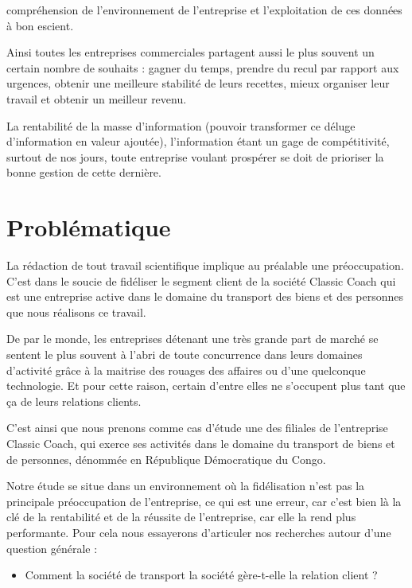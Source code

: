     compréhension de l’environnement de l’entreprise et l’exploitation de ces données à bon
    escient.
    \par
    Ainsi toutes les entreprises commerciales partagent aussi
    le plus souvent un certain nombre de souhaits : gagner
    du temps, prendre du recul par rapport aux urgences, obtenir une meilleure
    stabilité de leurs recettes, mieux organiser leur travail et obtenir un meilleur
    revenu. \cite*{Barouch2010}
    \par
    La rentabilité de la masse d’information (pouvoir transformer ce déluge
    d’information en valeur ajoutée), l’information étant un gage de compétitivité, surtout
    de nos jours, toute entreprise voulant prospérer se doit de prioriser la bonne gestion de
    cette dernière.
    \section[Problématique]{Problématique}
    La rédaction de tout travail scientifique implique au préalable une préoccupation.
    C’est dans le soucie de fidéliser le segment client de la société Classic Coach qui est une
    entreprise active dans le domaine du transport des biens et des personnes que nous
    réalisons ce travail.
    \par
    De par le monde, les entreprises détenant une très grande part de marché
    se sentent le plus souvent à l’abri de toute concurrence
    dans leurs domaines d’activité grâce à la maitrise des rouages des affaires
    ou d’une quelconque technologie. \cite*{Rouviere2010} Et pour cette raison,
    certain d’entre elles ne s’occupent plus tant que ça de leurs relations clients.
    \par
    C’est ainsi que nous prenons comme cas d’étude une des filiales de l’entreprise Classic Coach,
    qui exerce ses activités dans le domaine du transport de biens et de personnes, dénommée
    en République Démocratique du Congo.
    \par
    Notre étude se situe dans un environnement où la fidélisation n’est pas la principale
    préoccupation de l’entreprise, ce qui est une erreur, car c’est bien là la clé
    de la rentabilité et de la réussite de l’entreprise, car elle la rend plus performante.
    Pour cela nous essayerons d’articuler nos recherches autour d’une question générale :
    \par
        \begin{itemize}
            \item [\ding{226}] Comment la société de transport la société
            gère-t-elle la relation client ?
        \end{itemize}
